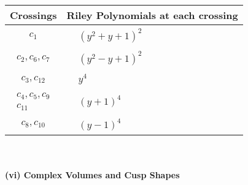 \documentclass[1p]{elsarticle_modified}
\theoremstyle{definition}
\begin{document}
\begin{tabular}{m{50pt}|m{274pt}}
Crossings & \hspace{64pt}Riley Polynomials at each crossing \\
\hline $$\begin{aligned}c_{1}\end{aligned}$$&$\begin{aligned}
&(y^2+y+1)^2
\end{aligned}$\\
\hline $$\begin{aligned}c_{2},c_{6},c_{7}\end{aligned}$$&$\begin{aligned}
&(y^2- y+1)^2
\end{aligned}$\\
\hline $$\begin{aligned}c_{3},c_{12}\end{aligned}$$&$\begin{aligned}
&y^4
\end{aligned}$\\
\hline $$\begin{aligned}c_{4},c_{5},c_{9}\\c_{11}\end{aligned}$$&$\begin{aligned}
&(y+1)^4
\end{aligned}$\\
\hline $$\begin{aligned}c_{8},c_{10}\end{aligned}$$&$\begin{aligned}
&(y-1)^4
\end{aligned}$\\
\hline
\end{tabular}\\~\\
\newpage\flushleft \textbf{(vi) Complex Volumes and Cusp Shapes}
\end{document}
